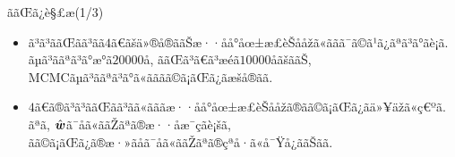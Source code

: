 \documentclass[dvipdfmx]{beamer} %
\newcommand{\bm}[1]{\mbox{\boldmath $#1$}}
\begin{document}
\begin{frame}{ããŒã¿è§£æ(1/3)}

\begin{itemize}
	\item 
	ã³ã³ããŒãã³ãã$4$ã€ãšä»®å®ããŠæ··åå°åœ±æ­£èŠååžã«ããã¯ã©ã¹ã¿ãªã³ã°ãè¡ã. ãµã³ããªã³ã°æ°ã$20000$å, ããŒã³ã€ã³æéã$10000$åãšããŠ, MCMCãµã³ããªã³ã°ã«ãããã©ã¡ãŒã¿ãæšå®ãã.
	\vspace{0.2cm}
	\item
	$4$ã€ã®ã³ã³ããŒãã³ãã«ãããæ··åå°åœ±æ­£èŠååžã®ãã©ã¡ãŒã¿ãä»¥äžã«ç€ºã. ãªã, $\hat {\bm w}$ã¯åã«ããŽãªã®æ··åæ¯çãè¡šã, ãã©ã¡ãŒã¿ã®æ·»ãå­ã¯åã«ããŽãªã®çªå·ã«å¯Ÿå¿ããŠãã.
\end{itemize}
 

\end{frame}
\end{document}
